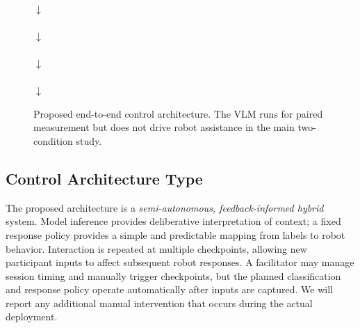 \documentclass[conference]{IEEEtran}
\begin{document}
\begin{figure}[htbp]
\centering
\setlength{\fboxsep}{7pt}
\\[7pt]
$\downarrow$\\[3pt]
\\[7pt]
$\downarrow$\\[3pt]
\\[7pt]
$\downarrow$\\[3pt]
\\[7pt]
$\downarrow$\\[3pt]
\caption{Proposed end-to-end control architecture. The VLM runs for paired measurement but does not drive robot assistance in the main two-condition study.}
\label{fig:architecture}
\end{figure}

\subsection{Control Architecture Type}
The proposed architecture is a \emph{semi-autonomous, feedback-informed hybrid} system. Model inference provides deliberative interpretation of context; a fixed response policy provides a simple and predictable mapping from labels to robot behavior. Interaction is repeated at multiple checkpoints, allowing new participant inputs to affect subsequent robot responses. A facilitator may manage session timing and manually trigger checkpoints, but the planned classification and response policy operate automatically after inputs are captured. We will report any additional manual intervention that occurs during the actual deployment.
\end{document}
